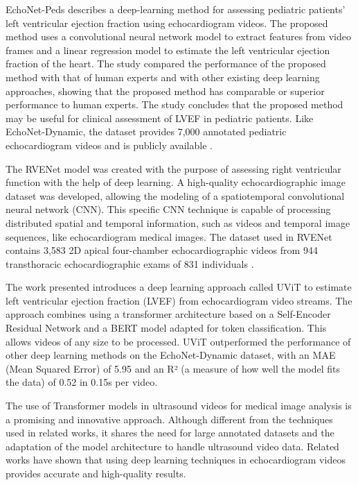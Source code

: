 \documentclass[a4paper,fleqn]{cas-dc}
\begin{document}
EchoNet-Peds describes a deep-learning method for assessing pediatric patients' left ventricular ejection fraction using echocardiogram videos. The proposed method uses a convolutional neural network model to extract features from video frames and a linear regression model to estimate the left ventricular ejection fraction of the heart. The study compared the performance of the proposed method with that of human experts and with other existing deep learning approaches, showing that the proposed method has comparable or superior performance to human experts. The study concludes that the proposed method may be useful for clinical assessment of LVEF in pediatric patients. Like EchoNet-Dynamic, the dataset provides 7,000 annotated pediatric echocardiogram videos and is publicly available \cite{Reddy2023}.

The RVENet model was created with the purpose of assessing right ventricular function with the help of deep learning. A high-quality echocardiographic image dataset was developed, allowing the modeling of a spatiotemporal convolutional neural network (CNN). This specific CNN technique is capable of processing distributed spatial and temporal information, such as videos and temporal image sequences, like echocardiogram medical images. The dataset used in RVENet contains 3,583 2D apical four-chamber echocardiographic videos from 944 transthoracic echocardiographic exams of 831 individuals \cite{10.1007/978-3-031-25066-8_33}.

The work presented \cite{Reynald} introduces a deep learning approach called UViT to estimate left ventricular ejection fraction (LVEF) from echocardiogram video streams. The approach combines using a transformer architecture based on a Self-Encoder Residual Network and a BERT model adapted for token classification. This allows videos of any size to be processed. UViT outperformed the performance of other deep learning methods on the EchoNet-Dynamic dataset, with an MAE (Mean Squared Error) of 5.95 and an R² (a measure of how well the model fits the data) of 0.52 in 0.15s per video.

The use of Transformer models in ultrasound videos for medical image analysis is a promising and innovative approach. Although different from the techniques used in related works, it shares the need for large annotated datasets and the adaptation of the model architecture to handle ultrasound video data. Related works have shown that using deep learning techniques in echocardiogram videos provides accurate and high-quality results.
\end{document}

